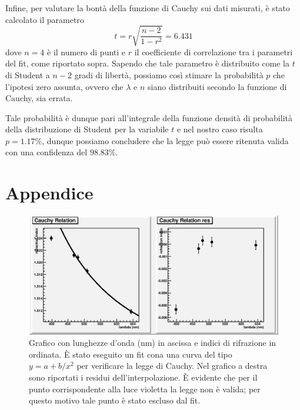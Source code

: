 \documentclass[italian,a4paper]{article}
\begin{document}
Infine, per valutare la bontà della funzione di Cauchy sui dati misurati, è stato calcolato il parametro
\begin{equation}
t=r\sqrt{\dfrac{n-2}{1-r^2}} = 6.431
\end{equation}
dove $n=4$ è il numero di punti e $r$ il coefficiente di correlazione tra i parametri del fit, come riportato sopra. Sapendo che tale parametro è distribuito come la $t$ di Student a $n-2$ gradi di libertà, possiamo così stimare la probabilità $p$ che l'ipotesi zero assunta, ovvero che $\lambda$ e $n$ siano distribuiti secondo la funzione di Cauchy, sia errata.

Tale probabilità è dunque pari all'integrale della funzione densità di probabilità della distribuzione di Student per la variabile $t$ e nel nostro caso risulta $p = 1.17 \%$, dunque possiamo concludere che la legge può essere ritenuta valida con una confidenza del $98.83\%$.


\newpage
\section{Appendice}
\begin{figure}[!h]\centering
\includegraphics[scale=.6]{cauchy.eps}
\caption{Grafico con lunghezze d'onda (\unit{nm}) in ascissa e indici di rifrazione in ordinata. \`{E} stato eseguito un fit cona una curva del tipo $y=a+b/x^2$ per verificare la legge di Cauchy. Nel grafico a destra sono riportati i residui dell'interpolazione. \`{E} evidente che per il punto corrispondente alla luce violetta la legge non è valida; per questo motivo tale punto è stato escluso dal fit.}\label{cauchy}
\end{figure}
\end{document}

